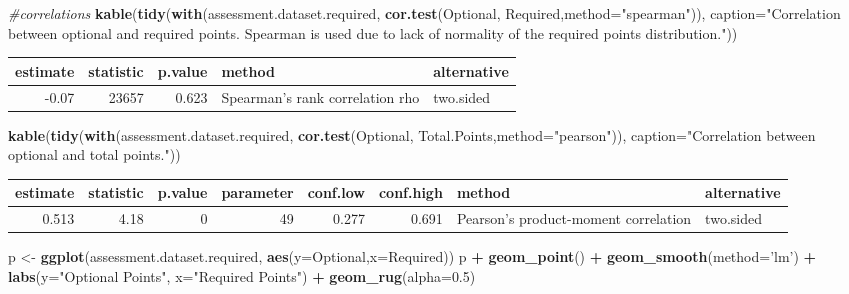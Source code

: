 \documentclass[]{article}
\newenvironment{Shaded}{\begin{snugshade}}{\end{snugshade}}
\newcommand{\KeywordTok}[1]{\textcolor[rgb]{0.13,0.29,0.53}{\textbf{#1}}}
\newcommand{\DataTypeTok}[1]{\textcolor[rgb]{0.13,0.29,0.53}{#1}}
\newcommand{\FloatTok}[1]{\textcolor[rgb]{0.00,0.00,0.81}{#1}}
\newcommand{\StringTok}[1]{\textcolor[rgb]{0.31,0.60,0.02}{#1}}
\newcommand{\CommentTok}[1]{\textcolor[rgb]{0.56,0.35,0.01}{\textit{#1}}}
\newcommand{\OperatorTok}[1]{\textcolor[rgb]{0.81,0.36,0.00}{\textbf{#1}}}
\newcommand{\NormalTok}[1]{#1}
\begin{document}
\begin{Shaded}
\begin{Highlighting}[]
\CommentTok{#correlations}
\KeywordTok{kable}\NormalTok{(}\KeywordTok{tidy}\NormalTok{(}\KeywordTok{with}\NormalTok{(assessment.dataset.required, }\KeywordTok{cor.test}\NormalTok{(Optional, Required,}\DataTypeTok{method=}\StringTok{"spearman"}\NormalTok{)), }\DataTypeTok{caption=}\StringTok{"Correlation between optional and required points.  Spearman is used due to lack of normality of the required points distribution."}\NormalTok{))}
\end{Highlighting}
\end{Shaded}

\begin{longtable}[]{@{}rrrll@{}}
\toprule
estimate & statistic & p.value & method & alternative\tabularnewline
\midrule
\endhead
-0.07 & 23657 & 0.623 & Spearman's rank correlation rho &
two.sided\tabularnewline
\bottomrule
\end{longtable}

\begin{Shaded}
\begin{Highlighting}[]
\KeywordTok{kable}\NormalTok{(}\KeywordTok{tidy}\NormalTok{(}\KeywordTok{with}\NormalTok{(assessment.dataset.required, }\KeywordTok{cor.test}\NormalTok{(Optional, Total.Points,}\DataTypeTok{method=}\StringTok{"pearson"}\NormalTok{)), }\DataTypeTok{caption=}\StringTok{"Correlation between optional and total points."}\NormalTok{))}
\end{Highlighting}
\end{Shaded}

\begin{longtable}[]{@{}rrrrrrll@{}}
\toprule
estimate & statistic & p.value & parameter & conf.low & conf.high &
method & alternative\tabularnewline
\midrule
\endhead
0.513 & 4.18 & 0 & 49 & 0.277 & 0.691 & Pearson's product-moment
correlation & two.sided\tabularnewline
\bottomrule
\end{longtable}

\begin{Shaded}
\begin{Highlighting}[]
\NormalTok{p <-}\StringTok{ }\KeywordTok{ggplot}\NormalTok{(assessment.dataset.required, }\KeywordTok{aes}\NormalTok{(}\DataTypeTok{y=}\NormalTok{Optional,}\DataTypeTok{x=}\NormalTok{Required))}
\NormalTok{p }\OperatorTok{+}\StringTok{ }\KeywordTok{geom_point}\NormalTok{() }\OperatorTok{+}
\StringTok{  }\KeywordTok{geom_smooth}\NormalTok{(}\DataTypeTok{method=}\StringTok{'lm'}\NormalTok{) }\OperatorTok{+}
\StringTok{  }\KeywordTok{labs}\NormalTok{(}\DataTypeTok{y=}\StringTok{"Optional Points"}\NormalTok{, }\DataTypeTok{x=}\StringTok{"Required Points"}\NormalTok{) }\OperatorTok{+}
\StringTok{  }\KeywordTok{geom_rug}\NormalTok{(}\DataTypeTok{alpha=}\FloatTok{0.5}\NormalTok{)}
\end{Highlighting}
\end{Shaded}
\end{document}
